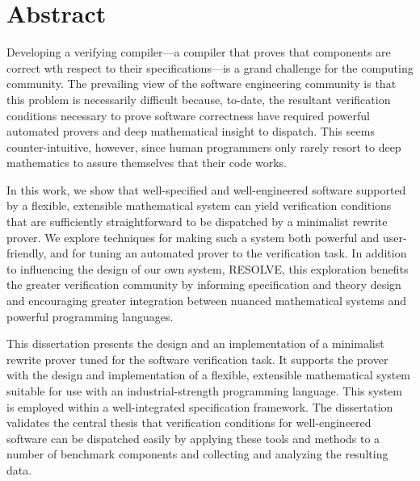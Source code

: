 \chapter*{Abstract}
Developing a verifying compiler---a compiler that proves that components are correct wth respect to their specifications---is a grand challenge for the computing community.  The prevailing view of the software engineering community is that this problem is necessarily difficult because, to-date, the resultant verification conditions necessary to prove software correctness have required powerful automated provers and deep mathematical insight to dispatch.  This seems counter-intuitive, however, since human programmers only rarely resort to deep mathematics to assure themselves that their code works.

In this work, we show that well-specified and well-engineered software supported by a flexible, extensible mathematical system can yield verification conditions that are sufficiently straightforward to be dispatched by a minimalist rewrite prover.  We explore techniques for making such a system both powerful and user-friendly, and for tuning an automated prover to the verification task.  In addition to influencing the design of our own system, RESOLVE, this exploration benefits the greater verification community by informing specification and theory design and encouraging greater integration between nuanced mathematical systems and powerful programming languages.

This dissertation presents the design and an implementation of a minimalist rewrite prover tuned for the software verification task.  It supports the prover with the design and implementation of a flexible, extensible mathematical system suitable for use with an industrial-strength programming language.  This system is employed within a well-integrated specification framework.  The dissertation validates the central thesis that verification conditions for well-engineered software can be dispatched easily by applying these tools and methods to a number of benchmark components and collecting and analyzing the resulting data.

